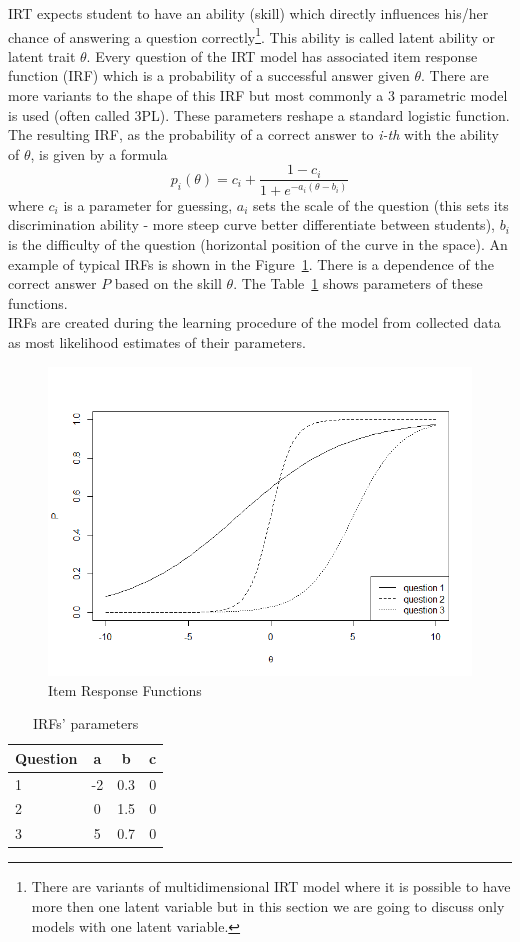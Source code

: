 IRT expects student to have an ability (skill) which directly influences his/her chance of answering a question correctly\footnote{There are variants of multidimensional IRT model where it is possible to have more then one latent variable but in this section we are going to discuss only models with one latent variable.}. This ability is called latent ability or latent trait $\theta$. Every question of the IRT model has associated item response function (IRF) which is a probability of a successful answer given $\theta$. There are more variants to the shape of this IRF but most commonly a 3 parametric model is used (often called 3PL). These parameters reshape a standard logistic function. The resulting IRF, as the probability of a correct answer to \textit{i-th} with the ability of $\theta$, is given by a formula
\begin{equation}
p_i(\theta) = c_i + \frac{1-c_i}{1+e^{-a_i(\theta-b_i)}}
\label{eq:IRF}
\end{equation}
where $c_i$ is a parameter for guessing, $a_i$ sets the scale of the question (this sets its discrimination ability - more steep curve better differentiate between students), $b_i$ is the difficulty of the question (horizontal position of the curve in the space). An example of typical IRFs is shown in the Figure~\ref{pic:IRFs}. There is a dependence of the correct answer $P$ based on the skill $\theta$. The Table~\ref{tab:IRFs} shows parameters of these functions.\\
IRFs are created during the learning procedure of the model from collected data as most likelihood estimates of their parameters.

\begin{figure}
  \includegraphics[width=0.8\columnwidth]{obr/irfs.png}%
  \caption{Item Response Functions}%
	\label{pic:IRFs}%
\end{figure}
\begin{table}%
	\begin{tabular}{lccc} \hline
		Question & a & b & c \\ \hline
		1 & -2 & 0.3 & 0\\
		2 & 0 & 1.5 & 0\\
		3 & 5 & 0.7 & 0\\
	\hline
  \end{tabular}
  \caption{IRFs' parameters}%
	\label{tab:IRFs}%
\end{table}
  


